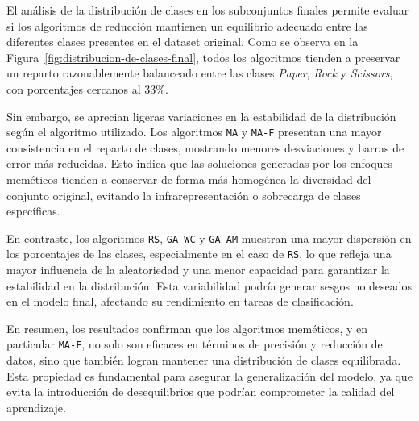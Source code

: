 El análisis de la distribución de clases en los subconjuntos finales permite evaluar si los algoritmos de reducción mantienen
un equilibrio adecuado entre las diferentes clases presentes en el dataset original.
Como se observa en la Figura~\ref{fig:distribucion-de-clases-final}, todos los algoritmos tienden a preservar un reparto
razonablemente balanceado entre las clases \textit{Paper}, \textit{Rock} y \textit{Scissors}, con porcentajes cercanos al 33\%.

Sin embargo, se aprecian ligeras variaciones en la estabilidad de la distribución según el algoritmo utilizado.
Los algoritmos \texttt{MA} y \texttt{MA-F} presentan una mayor consistencia en el reparto de clases,
mostrando menores desviaciones y barras de error más reducidas.
Esto indica que las soluciones generadas por los enfoques meméticos tienden a conservar de forma más homogénea la diversidad del conjunto original,
evitando la infrarepresentación o sobrecarga de clases específicas.

En contraste, los algoritmos \texttt{RS}, \texttt{GA-WC} y \texttt{GA-AM} muestran una mayor dispersión en los porcentajes de las clases,
especialmente en el caso de \texttt{RS}, lo que refleja una mayor influencia de la aleatoriedad y una menor capacidad para garantizar la estabilidad en la distribución.
Esta variabilidad podría generar sesgos no deseados en el modelo final, afectando su rendimiento en tareas de clasificación.

En resumen, los resultados confirman que los algoritmos meméticos, y en particular \texttt{MA-F},
no solo son eficaces en términos de precisión y reducción de datos, sino que también logran mantener una distribución de clases equilibrada.
Esta propiedad es fundamental para asegurar la generalización del modelo, ya que evita la introducción de desequilibrios que podrían comprometer la calidad del aprendizaje.

